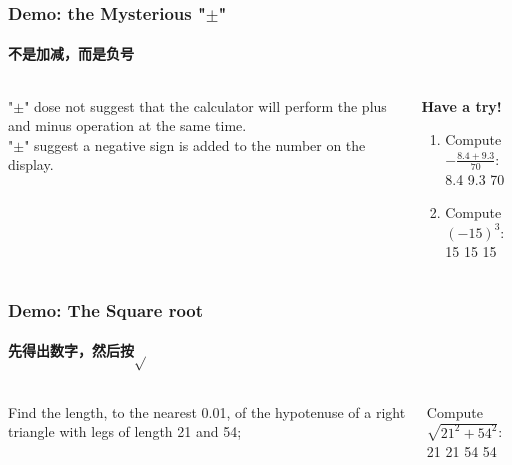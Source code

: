 \documentclass[
	11pt, %
]{beamer}
\begin{document}
\begin{frame}
	\frametitle{Demo: the Mysterious "$\pm$"}
	\framesubtitle{不是加减，而是负号}
	\begin{columns}[t]
				\begin{column}{0.5\textwidth}
			   "$\pm$" \alert{dose not} suggest that the calculator will perform the plus and minus operation at the same time. \\
			    "$\pm$" suggest  a negative sign is added to the number on the display. 
			  \end{column}

	        \begin{column}{0.5\textwidth}
	          \textbf{Have a try!}
		        \begin{enumerate}
							\item Compute $-\frac{8.4 + 9.3}{70}$: \\ \fbox{(} 8.4 \fbox{+} 9.3 \fbox{)} \fbox{$\div$} 70 \fbox{=} \fbox{$\pm$}
							\item Compute $(-15)^3$: \\ 15 \fbox{$\times$} 15 \fbox{$\times$} 15 \fbox{=} \fbox{$\pm$}
				   \end{enumerate}
					\end{column}
	\end{columns}
\end{frame}



\begin{frame}
	\frametitle{Demo: The Square root}
	\framesubtitle{先得出数字，然后按$\sqrt{}$}
	\begin{columns}[t]
				\begin{column}{0.5\textwidth}
				Find the length, to the nearest 0.01, of the hypotenuse of a right triangle with legs of length 21 and 54; 
			  \end{column}

	        \begin{column}{0.5\textwidth}
						 Compute $\sqrt{21^2 + 54^2}$: \\ 21 \fbox{$\times$} 21 \fbox{+} 54\fbox{$\times$} 54 \fbox{$=$} \fbox{$\sqrt{}$} 
					\end{column}
	\end{columns}
\end{frame}
\end{document}

